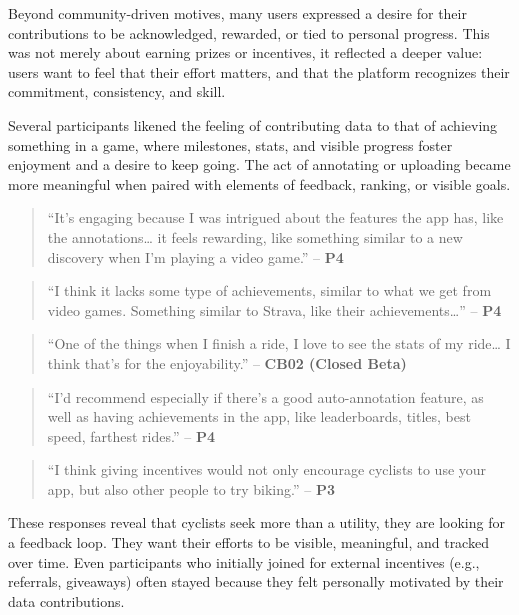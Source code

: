 Beyond community-driven motives, many users expressed a desire for their contributions to be acknowledged, rewarded, or tied to personal progress. This was not merely about earning prizes or incentives, it reflected a deeper value: users want to feel that their effort matters, and that the platform recognizes their commitment, consistency, and skill.

Several participants likened the feeling of contributing data to that of achieving something in a game, where milestones, stats, and visible progress foster enjoyment and a desire to keep going. The act of annotating or uploading became more meaningful when paired with elements of feedback, ranking, or visible goals.

\begin{quote}
``It's engaging because I was intrigued about the features the app has, like the annotations… it feels rewarding, like something similar to a new discovery when I'm playing a video game.'' – \textbf{P4}
\end{quote}

\begin{quote}
``I think it lacks some type of achievements, similar to what we get from video games. Something similar to Strava, like their achievements…'' – \textbf{P4}
\end{quote}

\begin{quote}
``One of the things when I finish a ride, I love to see the stats of my ride… I think that's for the enjoyability.'' – \textbf{CB02 (Closed Beta)}
\end{quote}

\begin{quote}
``I'd recommend especially if there's a good auto-annotation feature, as well as having achievements in the app, like leaderboards, titles, best speed, farthest rides.'' – \textbf{P4}
\end{quote}

\begin{quote}
``I think giving incentives would not only encourage cyclists to use your app, but also other people to try biking.'' – \textbf{P3}
\end{quote}

These responses reveal that cyclists seek more than a utility, they are looking for a feedback loop. They want their efforts to be visible, meaningful, and tracked over time. Even participants who initially joined for external incentives (e.g., referrals, giveaways) often stayed because they felt personally motivated by their data contributions.

